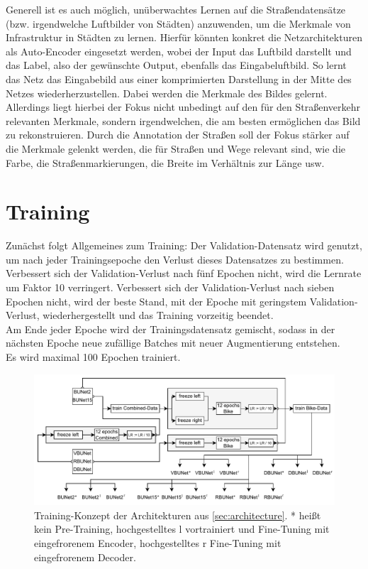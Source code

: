 Generell ist es auch möglich, unüberwachtes Lernen auf die Straßendatensätze (bzw. irgendwelche 
Luftbilder von Städten) anzuwenden, um die Merkmale von Infrastruktur in Städten zu lernen. 
Hierfür könnten konkret die Netzarchitekturen als Auto-Encoder eingesetzt werden, wobei der Input das 
Luftbild darstellt und das Label, also der gewünschte Output, ebenfalls das Eingabeluftbild. 
So lernt das Netz das Eingabebild aus einer komprimierten Darstellung in der Mitte des Netzes wiederherzustellen. 
Dabei werden die Merkmale des Bildes gelernt. Allerdings liegt hierbei der Fokus nicht unbedingt auf den für 
den Straßenverkehr relevanten Merkmale, sondern irgendwelchen, die am besten ermöglichen das Bild zu rekonstruieren. 
Durch die Annotation der Straßen soll der Fokus stärker auf die Merkmale gelenkt werden, die für Straßen und 
Wege relevant sind, wie die Farbe, die Straßenmarkierungen, die Breite im Verhältnis zur Länge usw. 


\section{Training} \label{sec:training}

Zunächst folgt Allgemeines zum Training:
Der Validation-Datensatz wird genutzt, um nach jeder Trainingsepoche den Verlust dieses Datensatzes zu bestimmen. 
Verbessert sich der Validation-Verlust nach fünf Epochen nicht, wird die Lernrate um Faktor 10 verringert. 
Verbessert sich der Validation-Verlust nach sieben Epochen nicht, wird der beste Stand, mit der Epoche mit geringstem 
Validation-Verlust, wiederhergestellt und das Training vorzeitig beendet.  \\
Am Ende jeder Epoche wird der Trainingsdatensatz gemischt, sodass in der nächsten Epoche neue zufällige 
Batches mit neuer Augmentierung entstehen. \\
Es wird maximal 100 Epochen trainiert.

\begin{figure}[h]
	\centering
	\includegraphics[width=1.\textwidth]{Bilder/training-concept.drawio.pdf} 
	\caption{Training-Konzept der Architekturen aus \autoref{sec:architecture}. * heißt kein Pre-Training,
	hochgestelltes l vortrainiert und Fine-Tuning mit eingefrorenem Encoder, hochgestelltes r Fine-Tuning mit eingefrorenem Decoder.}
	\label{fig:training}
\end{figure} 

